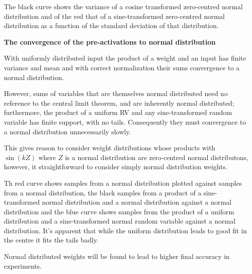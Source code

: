 \documentclass{letter}
\begin{document}
\begin{center}
\end{center}

The black curve shows the variance of a cosine transformed zero-centred normal distribution and of the red that of a sine-transformed zero-centred normal distribution as a function of the standard deviation of that distribution.

{\bf The convergence of the pre-activations to normal distribution}

With uniformly distributed input the product of a weight and an input has finite variance and mean and with correct normalization their sums convergence to a normal distribution.

However, sums of variables that are themselves normal distributed need no reference to the central limit theorem, and are inherently normal distributed; furthermore, the product of a uniform RV and any sine-transformed random variable has finite support, with no tails. Consequently they must convergence to a normal distribution unnecessarily slowly.

This gives reason to consider weight distributions whose products with $\sin(kZ)$ where $Z$ is a normal distribution are zero-centred normal distributons, however, it straightforward to consider simply normal distribution weights.

\begin{center}

\end{center}

Th red curve shows samples from a normal distribution plotted against samples from a normal distribution, the black samples from a product of a sine-transformed normal distribution and a normal distribution against a normal distribution and the blue curve shows samples from the product of a uniform distribution and a sine-transformed normal random variable against a normal distribution. It's apparent that while the uniform distribution leads to good fit in the centre it fits the tails badly.

Normal distributed weights will be found to lead to higher final accuracy in experiments.
\end{document}
